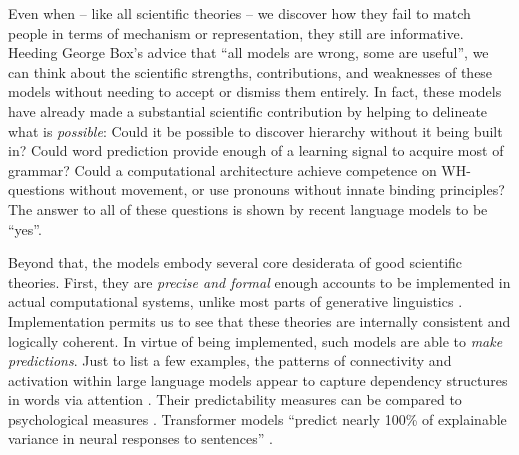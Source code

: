 \documentclass[output=paper,colorlinks,citecolor=brown]{langscibook}
\begin{document}
Even when -- like all scientific theories -- we discover how they fail to match people in terms of mechanism or representation, they still are informative. Heeding George Box's advice that ``all models are wrong, some are useful'', we can think about the scientific strengths, contributions, and weaknesses of these models without needing to accept or dismiss them entirely. In fact, these models have already made a substantial scientific contribution by helping to delineate what is \textit{possible}: Could it be possible to discover hierarchy without it being built in? Could word prediction provide enough of a learning signal to acquire most of grammar? Could a computational architecture achieve competence on WH-questions without movement, or use pronouns without innate binding principles? The answer to all of these questions is shown by recent language models to be ``yes''. 

Beyond that, the models embody several core desiderata of good scientific theories. First, they are
\textit{precise and formal} enough accounts to be implemented in actual computational systems, unlike most parts of generative linguistics \citep{pullum1989formal}. Implementation permits us to see that these theories are internally consistent and logically coherent. In virtue of being implemented, such models are able to \textit{make predictions}. Just to list a few examples, the patterns of connectivity and activation within large language models appear to capture dependency structures in words via attention \citep{manning2020emergent}. Their predictability measures can be compared to psychological measures \citep{hoover2022plausibility,shain2022large}. Transformer models ``predict nearly 100\% of explainable variance in neural responses to sentences'' \citep{schrimpf2021neural}. 
\end{document}
